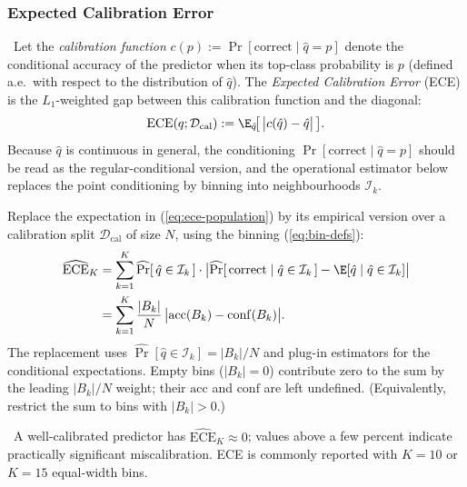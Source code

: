 \subsubsection{Expected Calibration Error}

\Def\ Let the \emph{calibration function} $c(p) := \Pr[\text{correct}
\mid \hat q = p]$ denote the conditional accuracy of the predictor
when its top-class probability is $p$ (defined a.e.\ with respect to
the distribution of $\hat q$). The \emph{Expected Calibration Error}
(ECE) is the $L_1$-weighted gap between this calibration function and
the diagonal:
\begin{equation}
\mathrm{ECE}(q; \mathcal{D}_{\mathrm{cal}})
  := \E_{\hat q}\!\big[\,\big| c(\hat q) - \hat q \big|\,\big].
\label{eq:ece-population}
\end{equation}
Because $\hat q$ is continuous in general, the conditioning
$\Pr[\text{correct} \mid \hat q = p]$ should be read as the
regular-conditional version, and the operational estimator below
replaces the point conditioning by binning into neighbourhoods
$\mathcal{I}_k$.

\begin{derivation}
Replace the expectation in (\ref{eq:ece-population}) by its empirical
version over a calibration split $\mathcal{D}_{\mathrm{cal}}$ of size
$N$, using the binning (\ref{eq:bin-defs}):
\begin{align}
\widehat{\mathrm{ECE}}_{K}
  &= \sum_{k=1}^{K} \widehat{\Pr}[\,\hat q \in \mathcal{I}_k\,]
       \cdot \big| \widehat{\Pr}[\,\text{correct} \mid \hat q \in \mathcal{I}_k\,] - \E[\hat q \mid \hat q \in \mathcal{I}_k] \big| \\
  &= \sum_{k=1}^{K} \frac{|B_k|}{N}\,
       \big| \mathrm{acc}(B_k) - \mathrm{conf}(B_k) \big|.
\label{eq:ece}
\end{align}
The replacement uses $\widehat{\Pr}[\hat q \in \mathcal{I}_k] = |B_k|/N$
and plug-in estimators for the conditional expectations. Empty bins
($|B_k| = 0$) contribute zero to the sum by the leading
$|B_k|/N$ weight; their $\mathrm{acc}$ and $\mathrm{conf}$ are
left undefined. (Equivalently, restrict the sum to bins with
$|B_k| > 0$.)
\end{derivation}

\Cons\ A well-calibrated predictor has
$\widehat{\mathrm{ECE}}_K \approx 0$; values above a few percent
indicate practically significant miscalibration. ECE is commonly
reported with $K = 10$ or $K = 15$ equal-width bins.

